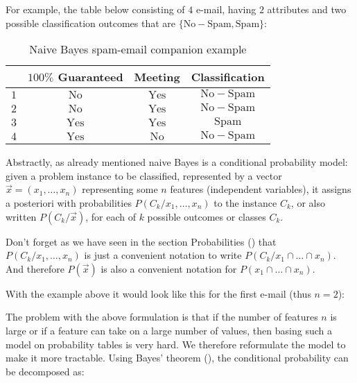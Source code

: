 	For example, the table below consisting of $4$ e-mail, having $2$ attributes and two possible classification outcomes that are $\{\mathrm{No-Spam},\mathrm{Spam}\}$:
	\begin{table}[H]
		\centering
		\begin{tabular}{|c|c|c|c|}
		\hline
		\rowcolor[HTML]{9B9B9B} 
		\multicolumn{1}{|l|}{\cellcolor[HTML]{9B9B9B}\textbf{Email}} & \multicolumn{1}{l|}{\cellcolor[HTML]{9B9B9B}\textbf{$100\%$ Guaranteed}} & \multicolumn{1}{l|}{\cellcolor[HTML]{9B9B9B}\textbf{Meeting}} & \multicolumn{1}{l|}{\cellcolor[HTML]{9B9B9B}\textbf{Classification}} \\ \hline
		$1$ & $\mathrm{No}$ & $\mathrm{Yes}$ & $\mathrm{No-Spam}$ \\ \hline
		$2$ & $\mathrm{No}$ & $\mathrm{Yes}$ & $\mathrm{No-Spam}$ \\ \hline
		$3$ & $\mathrm{Yes}$ & $\mathrm{Yes}$ & $\mathrm{Spam}$ \\ \hline
		$4$ & $\mathrm{Yes}$ & $\mathrm{No}$ & $\mathrm{No-Spam}$ \\ \hline
		\end{tabular}
		\caption{Naive Bayes spam-email companion example}
	\end{table}
	Abstractly, as already mentioned naive Bayes is a conditional probability model: given a problem instance to be classified, represented by a vector $\vec{x} =(x_{1},\dots ,x_{n})$ representing some $n$ features (independent variables), it assigns a posteriori with probabilities $P(C_k/x_1,\ldots,x_n)$ to the instance $C_k$, or also written $P(C_k/\vec{x})$, for each of $k$ possible outcomes or classes $C_k$.
	\begin{tcolorbox}[title=Remark,colframe=black,arc=10pt]
	Don't forget as we have seen in the section Probabilities () that $P(C_k/x_1,\ldots,x_n)$ is just a convenient notation to write $P(C_k/x_1\cap\ldots\cap x_n)$. And therefore $P(\vec{x})$ is also a convenient notation for $P(x_1\cap\ldots\cap x_n)$.
	\end{tcolorbox}
	With the example above it would look like this for the first e-mail (thus $n=2$):
	
	The problem with the above formulation is that if the number of features $n$ is large or if a feature can take on a large number of values, then basing such a model on probability tables is very hard. We therefore reformulate the model to make it more tractable. Using Bayes' theorem (), the conditional probability can be decomposed as:
	
